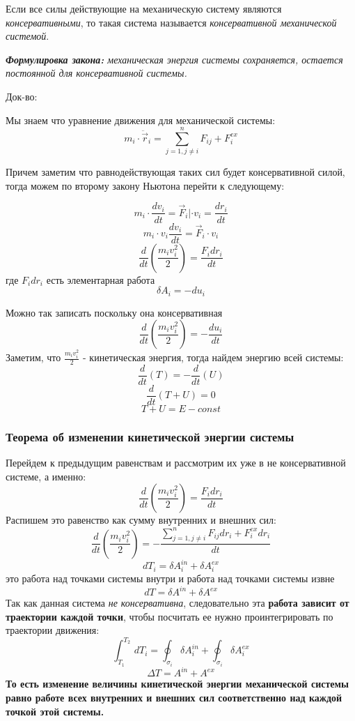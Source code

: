 \vspace{5px}

 Если все силы действующие на механическую систему являются \textit{консервативными}, то такая система называется \textit{консервативной механической системой}.

\vspace{5px}

\textit{\textbf{Формулировка закона:} механическая энергия системы сохраняется, остается постоянной для консервативной системы.}

\vspace{5px}

Док-во:

Мы знаем что уравнение движения для механической системы:
\[ m_i \cdot \ddot \vec r_i = \sum_{j=1, j \neq i }^n F_{ij} + F_i^{ex} \]

Причем заметим что равнодействующая таких сил будет консервативной силой, тогда можем по второму закону Ньютона перейти к следующему:

\[ m_i \cdot \frac{dv_i}{dt} = \vec F_i | \cdot v_i = \frac{dr_i}{dt}\]
\[ m_i\cdot v_i \frac{dv_i}{dt} = \vec F_i \cdot v_i \]
\[\frac{d}{dt}(\frac{m_i v^2_i}{2}) = \frac{F_i dr_i}{dt}\]
где ${F_i dr_i}$ есть элементарная работа
\[ \delta A_i = -du_i\]

Можно так записать поскольку она консервативная
\[\frac{d}{dt}(\frac{m_i v^2_i}{2}) = -\frac{du_i}{dt}\]
Заметим, что $\frac{m_i v^2_i}{2}$ - кинетическая энергия, тогда найдем энергию всей системы:
\[\frac{d}{dt}(T) = -\frac{d}{dt}(U) \] \[ \frac{d}{dt}(T+U) = 0 \]
\[T+U = E - const\]

\vspace{7px}


\subsubsection{Теорема об изменении кинетической энергии системы}

Перейдем к предыдущим равенствам и рассмотрим их уже в не консервативной системе, а именно:
\[ \frac{d}{dt}(\frac{m_i v^2_i}{2}) = \frac{F_i dr_i}{dt}\]
Распишем это равенство как сумму внутренних и внешних сил:
\[ \frac{d}{dt}(\frac{m_i v^2_i}{2}) = -\frac{\sum_{j=1, j \neq i }^n F_{ij} dr_i + F_i^{ex}dr_i}{dt}\]
\[dT_i = \delta A_i^{in} + \delta A_i ^{ex}\]
это работа над точками системы внутри и работа над точками системы извне
\[dT = \delta A^{in} + \delta A^{ex}\]
Так как данная система \textit{не консервативна}, следовательно эта \textbf{работа зависит от траектории каждой точки}, чтобы посчитать ее нужно проинтегрировать по траектории движения:
\[ \int_{T_1}^{T_2} \,dT_i = \oint_{\sigma_i} \delta A_i^{in} + \oint_{\sigma_i} \delta A_i^{ex}\]
\[ \Delta T =  A^{in} + A^{ex}\]
\textbf{То есть изменение величины кинетической энергии механической системы равно работе всех внутренних и внешних сил соответственно над каждой точкой этой системы.}
